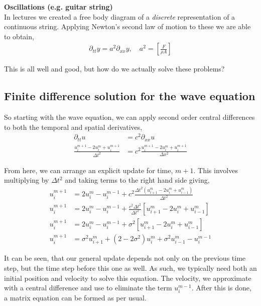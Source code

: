 \documentclass[11pt,a4paper]{report}
\theoremstyle{definition}
\begin{document}
\textbf{Oscillations (e.g. guitar string)} \\
In lectures we created a free body diagram of a \textit{discrete} representation of a continuous string. Applying Newton's second law of motion to these we are able to obtain,
\begin{align*}
	\partial_{tt} y = a^2 \partial_{xx} y, \quad a^2 = \left[\frac{F}{\rho A}\right]
\end{align*}

This is all well and good, but how do we actually solve these problems?

\subsection{Finite difference solution for the wave equation}
So starting with the wave equation, we can apply second order central differences to both the temporal and spatial derivatives,
\begin{align*}
\partial_{tt} u &= c^2 \partial_{xx} u \\
\frac{u_{i}^{m+1} - 2u_{i}^{m} + u_{i}^{m+1}}{\Delta t^2} &= c^2 \frac{u_{i}^{m+1} - 2u_{i}^{m} + u_{i}^{m+1}}{\Delta x^2}
\end{align*}

From here, we can arrange an explicit update for time, $m+1$. This involves multiplying by $\Delta t^2$ and taking terms to the right hand side giving,
\begin{align*}
	u_{i}^{m+1} &= 2u_{i}^{m} - u_{i}^{m-1} + c^2 \frac{\Delta t^2 (u_{i+1}^{m} - 2u_{i}^{m} + u_{i-1}^{m})}{\Delta t^2} \\
	u_{i}^{m+1} &= 2u_{i}^{m} - u_{i}^{m-1} + \frac{ c^2\Delta t^2 }{\Delta t^2} \left[u_{i+1}^{m} - 2u_{i}^{m} + u_{i-1}^{m}\right] \\
	u_{i}^{m+1} &= 2u_{i}^{m} - u_{i}^{m-1} + \sigma^2 \left[u_{i+1}^{m} - 2u_{i}^{m} + u_{i-1}^{m}\right] \\
	u_{i}^{m+1} &=\sigma^2 u_{i+1}^{m} + (2-2\sigma^2)u_{i}^{m} + \sigma^2u_{i-1}^{m}- u_{i}^{m-1} 
\end{align*}

It can be seen, that our general update depends not only on the previous time step, but the time step before this one as well. As such, we typically need both an initial position and velocity to solve this equation. The velocity, we approximate with a central difference and use to eliminate the term $u_i^{m-1}$. After this is done, a matrix equation can be formed as per usual.
\end{document}
